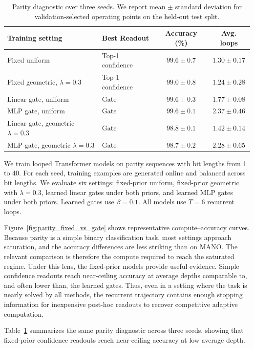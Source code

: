 \documentclass[10pt]{article} %
\begin{document}
\begin{table}[htbp]
\centering
\caption{
Parity diagnostic over three seeds.
We report mean $\pm$ standard deviation for validation-selected operating points on the held-out test split.
}
\label{tab:parity_seed_summary}
\begin{tabular}{llcc}
\toprule
Training setting & Best Readout & Accuracy (\%) & Avg. loops \\
\midrule
Fixed uniform & Top-1 confidence & $99.6 \pm 0.7$ & $1.30 \pm 0.17$ \\
Fixed geometric, $\lambda=0.3$ & Top-1 confidence & $99.0 \pm 0.8$ & $1.24 \pm 0.28$ \\
\midrule
Linear gate, uniform & Gate & $99.6 \pm 0.3$ & $1.77 \pm 0.08$ \\
MLP gate, uniform & Gate & $99.6 \pm 0.1$ & $2.37 \pm 0.46$ \\
Linear gate, geometric $\lambda=0.3$ & Gate & $98.8 \pm 0.1$ & $1.42 \pm 0.14$ \\
MLP gate, geometric $\lambda=0.3$ & Gate & $98.7 \pm 0.2$ & $2.28 \pm 0.65$ \\
\bottomrule
\end{tabular}
\end{table}

We train looped Transformer models on parity sequences with bit lengths from 1 to 40. For each seed, training examples are generated online and balanced across bit lengths. We evaluate six settings: fixed-prior uniform, fixed-prior geometric with \(\lambda=0.3\), learned linear gates under both priors, and learned MLP gates under both priors. Learned gates use \(\beta=0.1\). All models use \(T=6\) recurrent loops.

Figure~\ref{fig:parity_fixed_vs_gate} shows representative compute--accuracy curves. Because parity is a simple binary classification task, most settings approach saturation, and the accuracy differences are less striking than on MANO. The relevant comparison is therefore the compute required to reach the saturated regime. Under this lens, the fixed-prior models provide useful evidence. Simple confidence readouts reach near-ceiling accuracy at average depths comparable to, and often lower than, the learned gates. Thus, even in a setting where the task is nearly solved by all methods, the recurrent trajectory contains enough stopping information for inexpensive post-hoc readouts to recover competitive adaptive computation.

Table~\ref{tab:parity_seed_summary} summarizes the same parity diagnostic across three seeds, showing that fixed-prior confidence readouts reach near-ceiling accuracy at low average depth.
\end{document}

